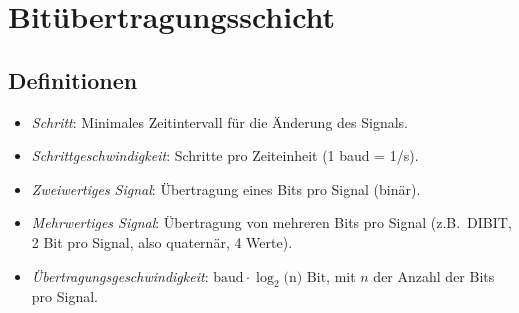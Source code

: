 \documentclass[a4paper,parskip=half*,DIV=15,fontsize=11pt]{scrartcl}
\begin{document}
\section{Bitübertragungsschicht}
\subsection{Definitionen}
\begin{itemize}
\item \emph{Schritt}: Minimales Zeitintervall für die Änderung des Signals.
\item \emph{Schrittgeschwindigkeit}: Schritte pro Zeiteinheit (1 baud = 1/s).
\item \emph{Zweiwertiges Signal}: Übertragung eines Bits pro Signal (binär).
\item \emph{Mehrwertiges Signal}: Übertragung von mehreren Bits pro Signal (z.B.\ DIBIT, 2 Bit pro Signal, also quaternär, 4 Werte).
\item \emph{Übertragungsgeschwindigkeit}: $\textrm{baud} \cdot \log_2($n$) \textrm{ Bit}$, mit $n$ der Anzahl der Bits pro Signal.
\end{itemize}
\end{document}
